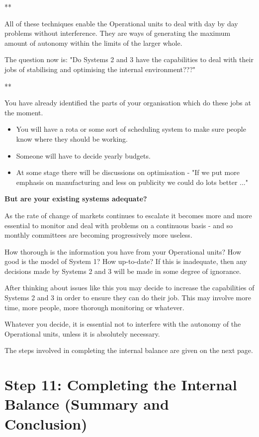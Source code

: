 **

All of these techniques enable the Operational units to deal with day by day problems without interference. They are ways of generating the maximum amount of autonomy within the limits of the larger whole.

The question now is:
"Do Systems 2 and 3 have the capabilities to deal with their jobs of stabilising and optimising the internal environment???"

**

You have already identified the parts of your organisation which do these jobs at the moment.

\begin{itemize}
  \item You will have a rota or some sort of scheduling system to make sure people know where they should be working.

  \item Someone will have to decide yearly budgets.

  \item At some stage there will be discussions on optimisation - "If we put more emphasis on manufacturing and less on publicity we could do lots better ..."

\end{itemize}

\textbf{But are your existing systems adequate?}

As the rate of change of markets continues to escalate it becomes more and more essential to monitor and deal with problems on a continuous basis - and so monthly committees are becoming progressively more useless.

How thorough is the information you have from your Operational units? How good is the model of System 1? How up-to-date? If this is inadequate, then any decisions made by Systems 2 and 3 will be made in some degree of ignorance.

After thinking about issues like this you may decide to increase the capabilities of Systems 2 and 3 in order to ensure they can do their job. This may involve more time, more people, more thorough monitoring or whatever.

Whatever you decide, it is essential not to interfere with the autonomy of the Operational units, unless it is absolutely necessary.

The steps involved in completing the internal balance are given on the next page.

\section*{Step 11: Completing the Internal Balance (Summary and Conclusion)}

